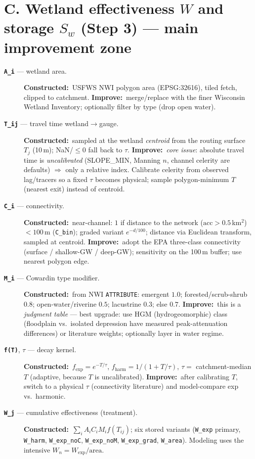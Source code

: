 \documentclass[11pt]{article}
\newcommand{\imp}{\textcolor{impcol}{\textbf{Improve:}}\ }
\newcommand{\con}{\textbf{Constructed:}\ }
\newcommand{\var}[1]{\textbf{\texttt{#1}}}
\begin{document}
\section{C. Wetland effectiveness $W$ and storage $S_w$ (Step 3) --- main improvement zone}
\begin{description}
\item[\var{A\_i} --- wetland area.] \con USFWS NWI polygon area (EPSG:32616), tiled fetch, clipped to catchment.
\imp merge/replace with the finer Wisconsin Wetland Inventory; optionally filter by type (drop open water).
\item[\var{T\_ij} --- travel time wetland$\to$gauge.] \con sampled at the wetland \emph{centroid} from the
routing surface $T_{j}$ (10\,m); NaN/$\le$0 fall back to $\tau$. \imp \emph{core issue}: absolute travel time is
\emph{uncalibrated} (SLOPE\_MIN, Manning $n$, channel celerity are defaults) $\Rightarrow$ only a relative index.
Calibrate celerity from observed lag/tracers so a fixed $\tau$ becomes physical; sample polygon-minimum $T$ (nearest exit) instead of centroid.
\item[\var{C\_i} --- connectivity.] \con near-channel: $1$ if distance to the network ($\text{acc}>0.5$\,km$^2$)
$<100$\,m (\texttt{C\_bin}); graded variant $e^{-d/100}$; distance via Euclidean transform, sampled at centroid.
\imp adopt the EPA three-class connectivity (surface / shallow-GW / deep-GW); sensitivity on the 100\,m buffer; use nearest polygon edge.
\item[\var{M\_i} --- Cowardin type modifier.] \con from NWI \texttt{ATTRIBUTE}: emergent $1.0$;
forested/scrub-shrub $0.8$; open-water/riverine $0.5$; lacustrine $0.3$; else $0.7$. \imp this is a
\emph{judgment table} --- best upgrade: use HGM (hydrogeomorphic) class (floodplain vs.\ isolated depression have
measured peak-attenuation differences) or literature weights; optionally layer in water regime.
\item[\var{f(T)}, $\tau$ --- decay kernel.] \con $f_{\exp}=e^{-T/\tau}$, $f_{\text{harm}}=1/(1+T/\tau)$,
$\tau=$ catchment-median $T$ (adaptive, because $T$ is uncalibrated). \imp after calibrating $T$, switch to a
physical $\tau$ (connectivity literature) and model-compare exp vs.\ harmonic.
\item[\var{W\_j} --- cumulative effectiveness (treatment).] \con $\sum_i A_i C_i M_i f(T_{ij})$; six stored
variants (\texttt{W\_exp} primary, \texttt{W\_harm}, \texttt{W\_exp\_noC}, \texttt{W\_exp\_noM},
\texttt{W\_exp\_grad}, \texttt{W\_area}). Modeling uses the intensive $W_n=W_{\exp}/\text{area}$.

\end{description}
\end{document}
